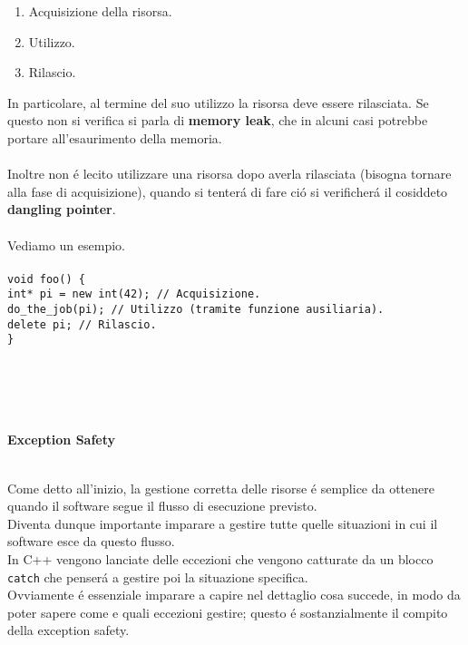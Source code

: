 \documentclass{article}
\newcommand\tab[1][1cm]{\hspace*{#1}}
\begin{document}
\begin{enumerate}
\item Acquisizione della risorsa.
\item Utilizzo.
\item Rilascio. \\
\end{enumerate}
In particolare, al termine del suo utilizzo la risorsa deve essere rilasciata. Se questo non si verifica si parla di \textbf{memory leak}, che in alcuni casi potrebbe portare all'esaurimento della memoria.\\
\\Inoltre non \'e lecito utilizzare una risorsa dopo averla rilasciata (bisogna tornare alla fase di acquisizione), quando si tenter\'a di fare ci\'o si verificher\'a il cosiddeto \textbf{dangling pointer}.\\ \\Vediamo un esempio.\\
\\ \texttt{void foo() \{ \\ \tab int* pi = new int(42); \textcolor{grigio}{// Acquisizione.} \\ \tab do\_the\_job(pi); \textcolor{grigio}{// Utilizzo (tramite funzione ausiliaria).} \\ \tab delete pi; \textcolor{grigio}{// Rilascio.} \\ \} }
\\ \\ \\ \\ \\
\begin{large} \textbf{\textcolor{blu}{Exception Safety}} \\ \\ \end{large}
Come detto all'inizio, la gestione corretta delle risorse \'e semplice da ottenere quando il software segue il flusso di esecuzione previsto. \\Diventa dunque importante imparare a gestire tutte quelle situazioni in cui il software esce da questo flusso. \\In C++ vengono lanciate delle eccezioni che vengono catturate da un blocco \texttt{catch} che penser\'a a gestire poi la situazione specifica.\\Ovviamente \'e essenziale imparare a capire nel dettaglio cosa succede, in modo da poter sapere come e quali eccezioni gestire; questo \'e sostanzialmente il compito della exception safety.\\ 
\end{document}
